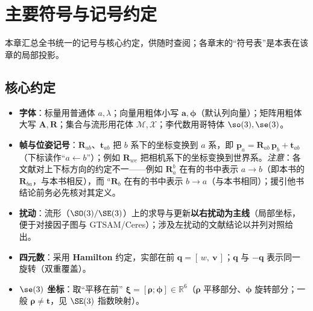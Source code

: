 \chapter*{主要符号与记号约定}
\label{ch:notation}

本章汇总全书统一的记号与核心约定，供随时查阅；各章末的“符号表”是本表在该章的局部投影。

\section*{核心约定}
\begin{itemize}
  \item \textbf{字体}：标量用普通体 $a,\lambda$；向量用粗体小写 $\mathbf{a},\boldsymbol{\phi}$（默认列向量）；矩阵用粗体大写 $\mathbf{A},\mathbf{R}$；集合与流形用花体 $\mathcal{M},\mathcal{X}$；李代数用哥特体 $\so(3),\se(3)$。
  \item \textbf{帧与位姿记号}：$\mathbf{R}_{ab}$、$\mathbf{t}_{ab}$ 把 $b$ 系下的坐标变换到 $a$ 系，即 $\mathbf{p}_a=\mathbf{R}_{ab}\,\mathbf{p}_b+\mathbf{t}_{ab}$（下标读作“$a\leftarrow b$”）；例如 $\mathbf{R}_{wc}$ 把相机系下的坐标变换到世界系。\emph{注意}：各文献对上下标方向的约定不一——例如 $\mathbf{R}_a^b$ 在有的书中表示 $a\to b$（即本书的 $\mathbf{R}_{ba}$，与本书相反），而 ${}^a\mathbf{R}_b$ 在有的书中表示 $b\to a$（与本书相同）；援引他书结论前务必先核对其定义。
  \item \textbf{扰动}：流形（$\SO(3)/\SE(3)$）上的求导与更新\textbf{以右扰动为主线}（局部坐标，便于对接因子图与 GTSAM/Ceres）；涉及左扰动的文献结论以并列对照给出。
  \item \textbf{四元数}：采用 \textbf{Hamilton} 约定，实部在前 $\mathbf{q}=[\,w,\ \mathbf{v}\,]$；$\mathbf{q}$ 与 $-\mathbf{q}$ 表示同一旋转（双重覆盖）。
  \item \textbf{$\se(3)$ 坐标}：取“平移在前” $\boldsymbol{\xi}=[\boldsymbol{\rho};\boldsymbol{\phi}]\in\mathbb{R}^6$（$\boldsymbol{\rho}$ 平移部分、$\boldsymbol{\phi}$ 旋转部分；一般 $\boldsymbol{\rho}\neq\mathbf{t}$，见 $\SE(3)$ 指数映射）。
\end{itemize}

